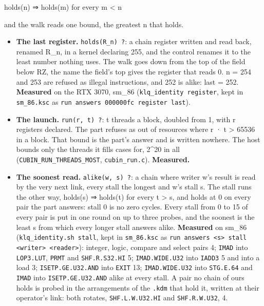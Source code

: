 holds(n) ⇒ holds(m) for every m < n

and the walk reads one bound, the greatest n that holds.

\begin{itemize}
\item \textbf{The last register.} \texttt{holds(R\_\allowbreak{}n) ?}: a chain register written and read back, renamed R\_\allowbreak{}n, in a kernel declaring 255, and the control renames it to the least number nothing uses. The walk goes down from the top of the field below RZ, the name the field's top gives the register that reads 0. n = 254 and 253 are refused as illegal instructions, and 252 is alike: last = 252. \textbf{Measured} on the RTX 3070, sm\_\allowbreak{}86 (\texttt{klq\_\allowbreak{}identity register}, kept in \texttt{sm\_\allowbreak{}86.\allowbreak{}ksc} as \texttt{run answers 000000fc register last}).
\item \textbf{The launch.} \texttt{run(r, t) ?}: t threads a block, doubled from 1, with r registers declared. The part refuses as out of resources where r · t > 65536 in a block. That bound is the part's answer and is written nowhere. The host bounds only the threads it fills cases for, 2\textasciicircum{}20 in all (\texttt{CUBIN\_\allowbreak{}RUN\_\allowbreak{}THREADS\_\allowbreak{}MOST}, \texttt{cubin\_\allowbreak{}run.\allowbreak{}c}). \textbf{Measured.}
\item \textbf{The soonest read.} \texttt{alike(w, s) ?}: a chain where writer w's result is read by the very next link, every stall the longest and w's stall s. The stall runs the other way, holds(s) ⇒ holds(t) for every t > s, and holds at 0 on every pair the part answers: stall 0 is no zero cycles. Every stall from 0 to 15 of every pair is put in one round on up to three probes, and the soonest is the least s from which every longer stall answers alike. \textbf{Measured} on sm\_\allowbreak{}86 (\texttt{klq\_\allowbreak{}identity.\allowbreak{}sh stall}, kept in \texttt{sm\_\allowbreak{}86.\allowbreak{}ksc} as \texttt{run answers <s> stall <writer> <reader>}): integer, logic, compare and select pairs 4; \texttt{IMAD} into \texttt{LOP3.\allowbreak{}LUT}, \texttt{PRMT} and \texttt{SHF.\allowbreak{}R.\allowbreak{}S32.\allowbreak{}HI} 5; \texttt{IMAD.\allowbreak{}WIDE.\allowbreak{}U32} into \texttt{IADD3} 5 and into a load 3; \texttt{ISETP.\allowbreak{}GE.\allowbreak{}U32.\allowbreak{}AND} into \texttt{EXIT} 13; \texttt{IMAD.\allowbreak{}WIDE.\allowbreak{}U32} into \texttt{STG.\allowbreak{}E.\allowbreak{}64} and \texttt{IMAD} into \texttt{ISETP.\allowbreak{}GE.\allowbreak{}U32.\allowbreak{}AND} alike at every stall. A pair no chain of ours holds is probed in the arrangements of the \texttt{.\allowbreak{}kdm} that hold it, written at their operator's link: both rotates, \texttt{SHF.\allowbreak{}L.\allowbreak{}W.\allowbreak{}U32.\allowbreak{}HI} and \texttt{SHF.\allowbreak{}R.\allowbreak{}W.\allowbreak{}U32}, 4.

\end{itemize}
